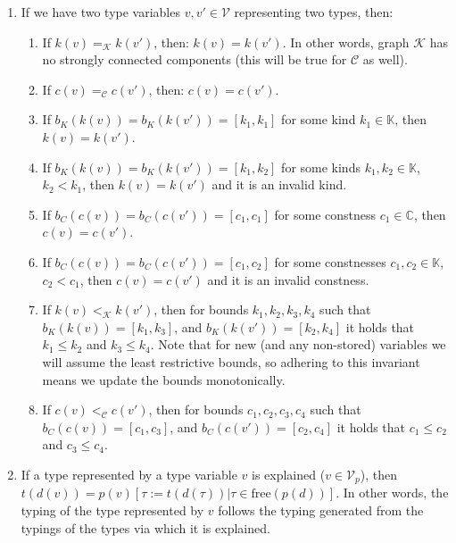 \begin{defn}
\begin{enumerate}
        \item \label{invG} If we have two type variables $v, v' \in \mathcal{V}$ representing two types, then:
            \begin{enumerate}
                \item If $k (v) =_\mathcal{K} k (v')$, then: $k (v) = k(v')$. In other words, graph $\mathcal{K}$ has no strongly connected components (this will be true for $\mathcal{C}$ as well).
                \item If $c (v) =_\mathcal{C} c (v')$, then: $c (v) = c(v')$.
                \item If $b_K (k (v)) = b_K (k (v')) = [k_1, k_1]$ for some kind $k_1 \in \mathbb{K}$, then $k (v) = k (v')$.
                \item If $b_K (k (v)) = b_K (k (v')) = [k_1, k_2]$ for some kinds $k_1, k_2 \in \mathbb{K}$, $k_2 < k_1$, then $k (v) = k (v')$ and it is an invalid kind.
                \item If $b_C (c (v)) = b_C (c (v')) = [c_1, c_1]$ for some constness $c_1 \in \mathbb{C}$, then $c (v) = c (v')$.
                \item If $b_C (c (v)) = b_C (c (v')) = [c_1, c_2]$ for some constnesses $c_1, c_2 \in \mathbb{K}$, $c_2 < c_1$, then $c (v) = c (v')$ and it is an invalid constness.
                \item If $k (v) <_\mathcal{K} k (v')$, then for bounds $k_1, k_2, k_3, k_4$ such that $b_K (k (v)) = [k_1, k_3]$, and $b_K (k (v')) = [k_2, k_4]$ it holds that $k_1 \leq k_2$ and $k_3 \leq k_4$. Note that for new (and any non-stored) variables we will assume the least restrictive bounds, so adhering to this invariant means we update the bounds monotonically.
                \item If $c (v) <_\mathcal{C} c (v')$, then for bounds $c_1, c_2, c_3, c_4$ such that $b_C (c (v)) = [c_1, c_3]$, and $b_C (c (v')) = [c_2, c_4]$ it holds that $c_1 \leq c_2$ and $c_3 \leq c_4$.
            \end{enumerate}

        \item If a type represented by a type variable $v$ is explained ($v \in \mathcal{V}_p$), then $t (d (v)) = p(v) \left[ \tau := t (d (\tau)) | \tau \in \mathrm{free} (p (d))\right]$. In other words, the typing of the type represented by $v$ follows the typing generated from the typings of the types via which it is explained. \label{invT}
    \end{enumerate}
\end{defn}


